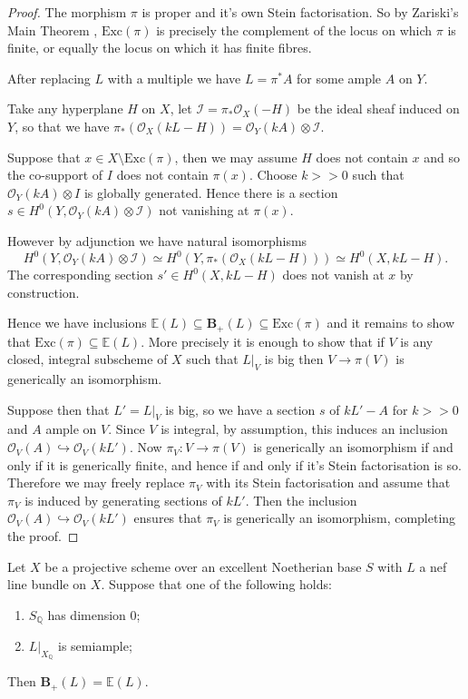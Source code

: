 \documentclass[a4paper,12pt]{book}
\newcommand{\BS}{\mathbf{B}_{+}}
\newcommand{\ox}[1][X]{\mathcal{O}_{#1}}
\begin{document}
\begin{proof}
	
	The morphism $\pi$ is proper and it's own Stein factorisation. So by Zariski's Main Theorem \cite[Tag 03GW]{stacks-project}, $\text{Exc}(\pi)$ is precisely the complement of the locus on which $\pi$ is finite, or equally the locus on which it has finite fibres.
	
	After replacing $L$ with a multiple we have $L=\pi^{*}A$ for some ample $A$ on $Y$.
	
	Take any hyperplane $H$ on $X$, let $\mathcal{I}=\pi_{*}\ox(-H)$ be the ideal sheaf induced on $Y$, so that we have $\pi_{*}(\ox(kL-H))=\ox[Y](kA)\otimes \mathcal{I}$. 
	
	Suppose that $x \in X \setminus \text{Exc}(\pi)$, then we may assume $H$ does not contain $x$ and so the co-support of $I$ does not contain $\pi(x)$. Choose $k>>0$ such that $\ox[Y](kA)\otimes I$ is globally generated. Hence there is a section $s \in H^{0}(Y,\ox[Y](kA)\otimes \mathcal{I})$ not vanishing at $\pi(x)$.
	
	However by adjunction we have natural isomorphisms $$H^{0}(Y,\ox[Y](kA)\otimes \mathcal{I}) \simeq H^{0}(Y,\pi_{*}(\ox(kL-H)))\simeq H^{0}(X,kL-H).$$ The corresponding section $s' \in H^{0}(X,kL-H)$ does not vanish at $x$ by construction.
	
	Hence we have inclusions $\mathbb{E}(L)\subseteq \BS(L)\subseteq \text{Exc}(\pi)$ and it remains to show that $\text{Exc}(\pi) \subseteq \mathbb{E}(L)$. More precisely it is enough to show that if $V$ is any closed, integral subscheme of $X$ such that $L|_{V}$ is big then $V \to \pi(V)$ is generically an isomorphism. 
	
	Suppose then that $L'=L|_{V}$ is big, so we have a section $s$ of $kL'-A$ for $k>>0$ and $A$ ample on $V$. Since $V$ is integral, by assumption, this induces an inclusion $\ox[V](A) \hookrightarrow \ox[V](kL')$. Now $\pi_{V}:V \to \pi(V)$ is generically an isomorphism if and only if it is generically finite, and hence if and only if it's Stein factorisation is so. Therefore we may freely replace $\pi_{V}$ with its Stein factorisation and assume that $\pi_{V}$ is induced by generating sections of $kL'$. Then the inclusion $\ox[V](A) \hookrightarrow \ox[V](kL')$ ensures that $\pi_{V}$ is generically an isomorphism, completing the proof.
\end{proof}


\begin{corollary}\label{Main_Loci}
	Let $X$ be a projective scheme over an excellent Noetherian base $S$ with $L$ a nef line bundle on $X$. 
	Suppose that one of the following holds:
	\begin{enumerate}
		\item $S_{\mathbb{Q}}$ has dimension $0$;
		\item $L|_{X_{\mathbb{Q}}}$ is semiample;
	\end{enumerate}
	Then $\BS(L)=\mathbb{E}(L)$.
\end{corollary}
\end{document}
